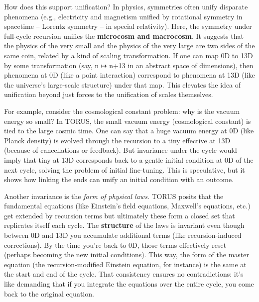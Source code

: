 \documentclass[]{article}
\begin{document}
How does this support unification? In physics, symmetries often unify
disparate phenomena (e.g., electricity and magnetism unified by
rotational symmetry in spacetime -- Lorentz symmetry -- in special
relativity). Here, the symmetry under full-cycle recursion unifies the
\textbf{microcosm and macrocosm}. It suggests that the physics of the
very small and the physics of the very large are two sides of the same
coin, related by a kind of scaling transformation. If one can map 0D to
13D by some transformation (say, n ↦ n+13 in an abstract space of
dimensions), then phenomena at 0D (like a point interaction) correspond
to phenomena at 13D (like the universe's large-scale structure) under
that map. This elevates the idea of unification beyond just forces to
the unification of scales themselves.

For example, consider the cosmological constant problem: why is the
vacuum energy so small? In TORUS, the small vacuum energy (cosmological
constant) is tied to the large cosmic time. One can say that a huge
vacuum energy at 0D (like Planck density) is evolved through the
recursion to a tiny effective \Lambda at 13D (because of cancellations or
feedback). But invariance under the cycle would imply that tiny \Lambda at 13D
corresponds back to a gentle initial condition at 0D of the next cycle,
solving the problem of initial fine-tuning. This is speculative, but it
shows how linking the ends can unify an initial condition with an
outcome.

Another invariance is the \emph{form of physical laws}. TORUS posits
that the fundamental equations (like Einstein's field equations,
Maxwell's equations, etc.) get extended by recursion terms but
ultimately these form a closed set that replicates itself each cycle.
The \textbf{structure} of the laws is invariant even though between 0D
and 13D you accumulate additional terms (like recursion-induced
corrections). By the time you're back to 0D, those terms effectively
reset (perhaps becoming the new initial conditions). This way, the form
of the master equation (the recursion-modified Einstein equation, for
instance) is the same at the start and end of the cycle​. That
consistency ensures no contradictions: it's like demanding that if you
integrate the equations over the entire cycle, you come back to the
original equation.
\end{document}
